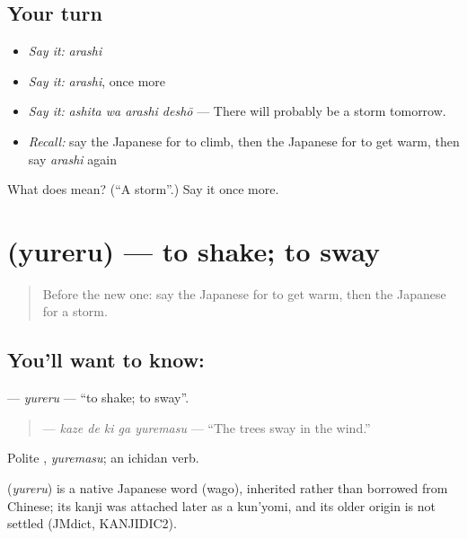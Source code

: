 \subsection*{Your turn}
\begin{itemize}
\raggedright
  \item \emph{Say it:} \emph{arashi}
  \item \emph{Say it:} \emph{arashi}, once more
  \item \emph{Say it:} \emph{ashita wa arashi deshō} — There will probably be a storm tomorrow.
  \item \emph{Recall:} say the Japanese for to climb, then the Japanese for to get warm, then say \emph{arashi} again
\end{itemize}

\begin{tcolorbox}[breakable,colback=teal!4,colframe=teal!35!black,title={Before you move on}]
What does  mean? (\textquotedblleft{}A storm\textquotedblright{}.) Say it once more.
\end{tcolorbox}
\section[\texorpdfstring{\ja{ゆれる} (yureru)}{ゆれる (yureru)}]{ (yureru) — to shake; to sway}

\label{lesson:JA-C214-yureru}



\begin{quote}
Before the new one: say the Japanese for to get warm, then the Japanese for a storm.
\end{quote}

\subsection*{You'll want to know: }
\textbf{} — \emph{yureru} — \textquotedblleft{}to shake; to sway\textquotedblright{}.

\begin{quote}
\textbf{  } — \emph{kaze de ki ga yuremasu} — \textquotedblleft{}The trees sway in the wind.\textquotedblright{}
\end{quote}

Polite \textbf{}, \emph{yuremasu}; an ichidan verb.

\begin{cousinweb}
\textbf{} (\emph{yureru}) is a native Japanese word (wago), inherited rather than borrowed from Chinese; its kanji was attached later as a kun'yomi, and its older origin is not settled (JMdict, KANJIDIC2).
\end{cousinweb}

